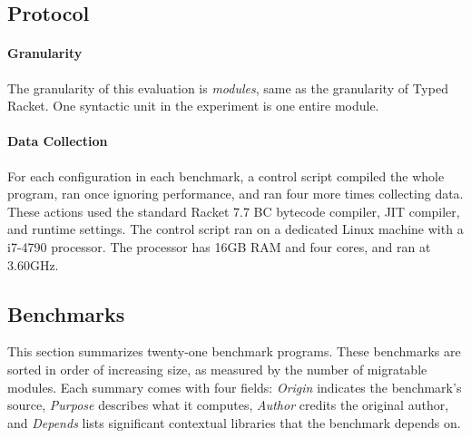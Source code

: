 \documentclass[ twoside,open=right,titlepage,numbers=noenddot,headinclude,%
                footinclude=true,cleardoublepage=empty,abstract=off,
                BCOR=5mm,paper=a4,fontsize=11pt,%
                ngerman,american,%
                parts,pdfspacing]{scrreprt}
\newcommand{\Ssubsubsection}[2]{\subsubsection[#1]{#2}}
\renewcommand{\Ssubsubsection}[2]{\subsection[#1]{#2}}
\begin{document}
\Ssubsubsection{Protocol}{Protocol}\label{t:x28part_x22secx3atrx3aprotocolx22x29}

\paragraph{Granularity}
The granularity of this evaluation is \emph{modules}, same as the granularity
 of Typed Racket.
One syntactic unit in the experiment is one entire module.

\paragraph{Data Collection}

For each configuration in each benchmark, a control script compiled
 the whole program, ran once ignoring performance, and ran four more times
 collecting data.
These actions used the standard Racket 7.7 BC bytecode compiler,
 JIT compiler, and runtime settings.
The control script ran on a dedicated Linux machine with a i7{-}4790
 processor.
The processor has 16GB RAM and four cores,
 and ran at 3.60GHz.

\Ssubsubsection{Benchmarks}{Benchmarks}\label{t:x28part_x22secx3atrx3abenchmarksx22x29}

This section summarizes twenty{-}one benchmark programs.
These benchmarks are sorted in order of increasing size, as measured by the
 number of migratable modules.
Each summary comes with four fields:
 \emph{Origin} indicates the benchmark{'}s source,
 \emph{Purpose} describes what it computes,
 \emph{Author} credits the original author,
 and \emph{Depends} lists significant contextual libraries that the benchmark depends on.
\end{document}
